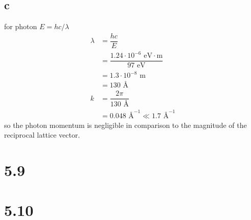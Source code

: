 \documentclass[12pt]{article}
\renewcommand{\=}[1]{\stackrel{#1}{=}} %
\theoremstyle{definition}
\theoremstyle{remark}
\begin{document}
\subsection*{c}
for photon \(E=hc/\lambda\)
\begin{align*}
\lambda &= \dfrac{hc}{E}\\[3mm]
	&= \dfrac{1.24\cdot 10^{-6} \text{ eV}\cdot\text{m}}{97\text{ eV}}\\[3mm]
	&= 1.3\cdot 10^{-8}\text{ m}\\[3mm]
	&= 130\text{ \AA}\\[5mm]
k &= \dfrac{2\pi}{130\text{ \AA}}\\[3mm]
	&= 0.048\text{ \AA}^{-1} \ll 1.7\text{ \AA}^{-1}
\end{align*}
so the photon momentum is negligible in comparison to the magnitude of the reciprocal lattice vector.


\newpage
\section*{5.9}





\newpage
\section*{5.10}
\end{document}
